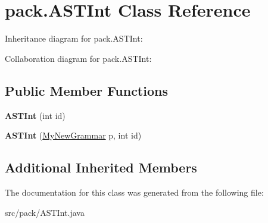 \hypertarget{classpack_1_1_a_s_t_int}{}\section{pack.\+A\+S\+T\+Int Class Reference}
\label{classpack_1_1_a_s_t_int}


Inheritance diagram for pack.\+A\+S\+T\+Int\+:


Collaboration diagram for pack.\+A\+S\+T\+Int\+:
\subsection*{Public Member Functions}
\begin{DoxyCompactItemize}
\item 
{\bfseries A\+S\+T\+Int} (int id)\hypertarget{classpack_1_1_a_s_t_int_acb113c5feeb14b5afdbed8fbd76ff346}{}\label{classpack_1_1_a_s_t_int_acb113c5feeb14b5afdbed8fbd76ff346}

\item 
{\bfseries A\+S\+T\+Int} (\hyperlink{classpack_1_1_my_new_grammar}{My\+New\+Grammar} p, int id)\hypertarget{classpack_1_1_a_s_t_int_abc966e6bcb464b71a379dcf39d95b7a2}{}\label{classpack_1_1_a_s_t_int_abc966e6bcb464b71a379dcf39d95b7a2}

\end{DoxyCompactItemize}
\subsection*{Additional Inherited Members}


The documentation for this class was generated from the following file\+:\begin{DoxyCompactItemize}
\item 
src/pack/A\+S\+T\+Int.\+java\end{DoxyCompactItemize}
